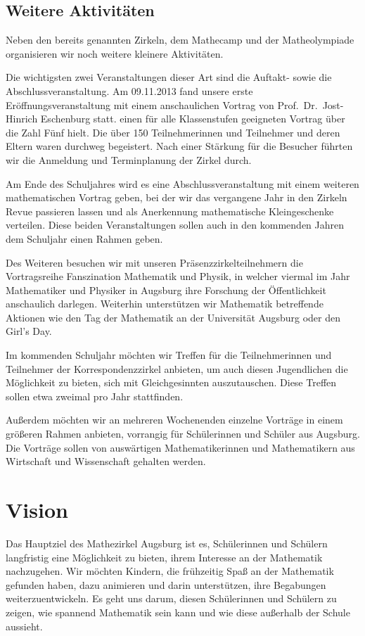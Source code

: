 \documentclass[12pt]{zettel}
\begin{document}
\subsection{Weitere Aktivitäten}

Neben den bereits genannten Zirkeln, dem Mathecamp und der
Matheolympiade organisieren wir noch weitere kleinere
Aktivitäten.

Die wichtigsten zwei Veranstaltungen dieser Art sind die Auftakt- sowie die
Abschlussveranstaltung. Am 09.11.2013 fand unsere erste
Eröffnungsveranstaltung mit einem anschaulichen Vortrag von
Prof.~Dr.~Jost-Hinrich Eschenburg statt.
einen für alle Klassenstufen geeigneten Vortrag über die Zahl Fünf
hielt. Die über 150 Teilnehmerinnen und Teilnehmer und deren Eltern waren durchweg
begeistert. Nach einer Stärkung für die Besucher führten wir
die Anmeldung und Terminplanung der Zirkel durch.

Am Ende des Schuljahres wird es eine Abschlussveranstaltung mit einem
weiteren mathematischen Vortrag geben, bei der wir
das vergangene Jahr in den Zirkeln Revue passieren lassen und als Anerkennung
mathematische Kleingeschenke verteilen. Diese beiden Veranstaltungen sollen
auch in den kommenden Jahren dem Schuljahr einen Rahmen geben.

Des Weiteren besuchen wir mit unseren Präsenzzirkelteilnehmern die
Vortragsreihe Fanszination Mathematik und Physik, in welcher viermal im
Jahr Mathematiker und Physiker in Augsburg ihre Forschung der
Öffentlichkeit anschaulich darlegen. Weiterhin unterstützen wir
Mathematik betreffende Aktionen wie den Tag der Mathematik an
der Universität Augsburg oder den Girl's Day.

Im kommenden Schuljahr möchten wir Treffen für die Teilnehmerinnen und
Teilnehmer der Korrespondenzzirkel anbieten, um auch diesen Jugendlichen die
Möglichkeit zu bieten, sich mit Gleichgesinnten auszutauschen. Diese Treffen
sollen etwa zweimal pro Jahr stattfinden.

Außerdem möchten wir an mehreren Wochenenden einzelne Vorträge in einem
größeren Rahmen anbieten, vorrangig für Schülerinnen und Schüler aus Augsburg.
Die Vorträge sollen von auswärtigen Mathematikerinnen und Mathematikern aus
Wirtschaft und Wissenschaft gehalten werden.


\section{Vision}

Das Hauptziel des Mathezirkel Augsburg ist es, Schülerinnen und Schülern
langfristig eine Möglichkeit zu bieten, ihrem Interesse an der
Mathematik nachzugehen. Wir möchten Kindern, die frühzeitig Spaß an der
Mathematik gefunden haben, dazu animieren und darin unterstützen, ihre
Begabungen weiterzuentwickeln.
Es geht uns darum, diesen Schülerinnen und
Schülern zu zeigen, wie spannend Mathematik sein kann und wie diese außerhalb der Schule aussieht. 
\end{document}
